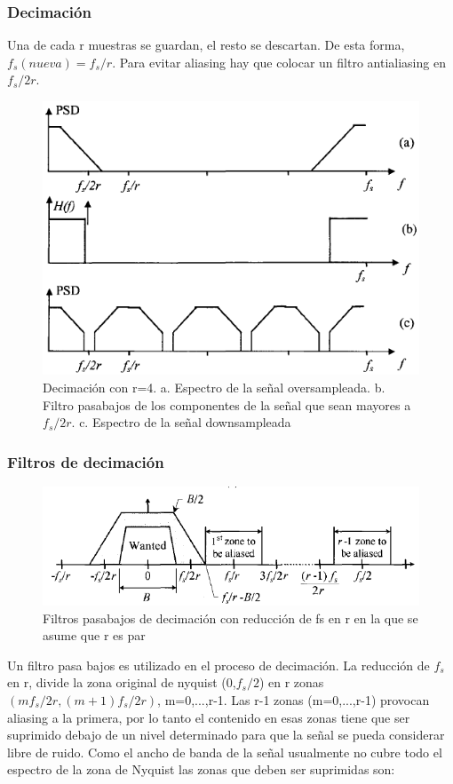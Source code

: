\documentclass[assd_tp3_main.tex]{subfiles}
\begin{document}
\subsubsection{Decimación}
Una de cada r muestras se guardan, el resto se descartan. 
De esta forma, $f_s(nueva)=f_s/r$. Para evitar aliasing hay que colocar un filtro antialiasing en $f_s/2r$.
\begin{figure}[H]
\centering
\includegraphics[width=0.6\linewidth]{images/ej4/antialiasing_decimation.png}
\caption{Decimación con r=4. a. Espectro de la señal oversampleada. b. Filtro pasabajos de los componentes de la señal que sean mayores a $f_s/2r$. c. Espectro de la señal downsampleada}
\label{fig:antialiasing_decimation}
\end{figure}

\subsubsection{Filtros de decimación}
\begin{figure}[H]
\centering
\includegraphics[width=0.7\linewidth]{images/ej4/Alias_decimation.png}
\caption{Filtros pasabajos de decimación con reducción de fs en r en la que se asume que r es par}
\label{fig:Alias_decimation}
\end{figure}


Un filtro pasa bajos es utilizado en el proceso de decimación. La reducción de $f_s$ en r, divide la zona original de nyquist (0,$f_s/2$) en r zonas $(mf_s/2r,(m+1)f_s/2r)$, m=0,...,r-1. Las r-1 zonas (m=0,...,r-1) provocan aliasing a la primera, por lo tanto el contenido en esas zonas tiene que ser suprimido debajo de un nivel determinado para que la señal se pueda considerar libre de ruido. Como el ancho de banda de la señal usualmente no cubre todo el espectro de la zona de Nyquist las zonas que deben ser suprimidas son:
\end{document}

